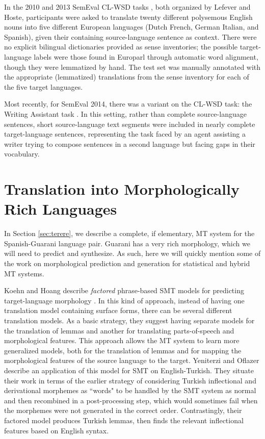 In the 2010 and 2013 SemEval CL-WSD tasks
\cite{lefever-hoste:2010:SemEval,task10}, both organized by Lefever and Hoste,
participants were asked to translate twenty different polysemous English nouns
into five different European languages (Dutch French, German Italian, and
Spanish), given their containing source-language sentence as context. There
were no explicit bilingual dictionaries provided as sense inventories; the
possible target-language labels were those found in Europarl \cite{europarl}
through automatic word alignment, though they were lemmatized by hand. The test
set was manually annotated with the appropriate (lemmatized) translations from
the sense inventory for each of the five target languages.

Most recently, for SemEval 2014, there was a variant on the CL-WSD task: the
Writing Assistant task \cite{vangompel-EtAl:2014:SemEval}. In this setting,
rather than complete source-language sentences, short source-language text
segments were included in nearly complete target-language sentences,
representing the task faced by an agent assisting a writer trying to compose
sentences in a second language but facing gaps in their vocabulary.

\section{Translation into Morphologically Rich Languages}
In Section \ref{sec:terere}, we describe a complete, if elementary, MT system
for the Spanish-Guarani language pair. Guarani has a very rich morphology,
which we will need to predict and synthesize. As such, here we will quickly
mention some of the work on morphological prediction and generation for
statistical and hybrid MT systems.

Koehn and Hoang describe \emph{factored} phrase-based SMT models for predicting
target-language morphology \cite{koehn-hoang:2007:EMNLP-CoNLL2007}. In this
kind of approach, instead of having one translation model containing surface
forms, there can be several different translation models. As a basic strategy,
they suggest having separate models for the translation of lemmas and another
for translating parts-of-speech and morphological features. This approach
allows the MT system to learn more generalized models, both for the translation
of lemmas and for mapping the morphological features of the source language to
the target.
Yeniterzi and Oflazer \cite{yeniterzi-oflazer:2010:ACL} describe an
application of this model for SMT on English-Turkish.
They situate their work in terms of the earlier strategy of considering Turkish
inflectional and derivational morphemes as ``words" to be handled by the SMT
system as normal and then recombined in a post-processing step, which would
sometimes fail when the morphemes were not generated in the correct order.
Contrastingly, their factored model produces Turkish lemmas, then finds the
relevant inflectional features based on English syntax.

